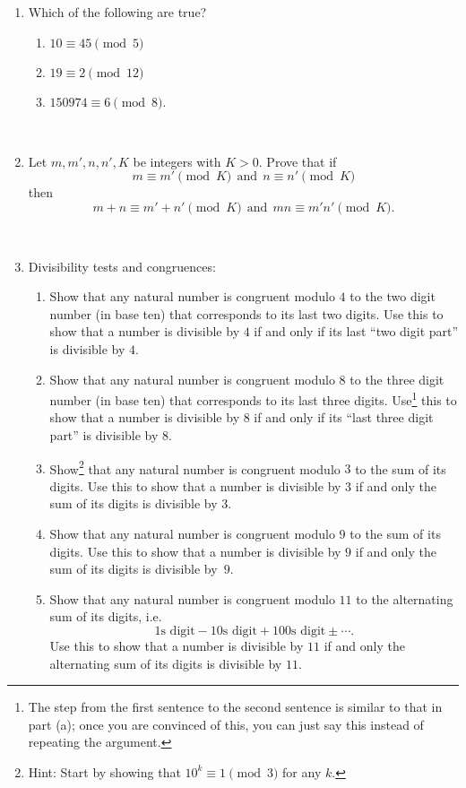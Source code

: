 \documentclass{amsart}
\begin{document}
\begin{enumerate}

\item Which of the following are true?
\begin{enumerate}
\item $10 \equiv 45 \pmod 5$
\item $19 \equiv 2 \pmod{12}$
\item $150974 \equiv 6 \pmod 8$.
\end{enumerate}


\


\item Let $m,m',n,n',K$ be integers with $K>0$. Prove that if
\[ m \equiv m' \pmod K \ \ \text{and}\  \ n \equiv n' \pmod K\]
then
\[ m+n \equiv m'+n' \pmod K \ \ \text{and} \ \ mn \equiv m'n'\pmod K.\]

\





\item Divisibility tests and congruences:
\begin{enumerate}
\item Show that any natural number is congruent modulo $4$ to the two digit number (in base ten) that corresponds to its last two digits. Use this to show that a number is divisible by $4$ if and only if its last ``two digit part'' is divisible by $4$.
\item Show that any natural number is congruent modulo $8$ to the three digit number (in base ten) that corresponds to its last three digits. Use\footnote{The step from the first sentence to the second sentence is similar to that in part (a); once you are convinced of this, you can just say this instead of repeating the argument.} this to show that a number is divisible by $8$ if and only if its ``last three digit part'' is divisible by $8$.
\item Show\footnote{Hint: Start by showing that $10^k \equiv 1 \pmod 3$ for any $k$.} that any natural number is congruent modulo $3$ to the sum of its digits. Use this to show that a number is divisible by $3$ if and only the sum of its digits is divisible by $3$.
\item Show that any natural number is congruent modulo $9$ to the sum of its digits. Use this to show that a number is divisible by $9$ if and only the sum of its digits is divisible by~$9$.
\item Show that any natural number is congruent modulo $11$ to the alternating sum of its digits, i.e.
\[ \text{1s digit} - \text{10s digit} + \text{100s digit} \pm \cdots.\]
Use this to show that a number is divisible by $11$ if and only the alternating sum of its digits is divisible by $11$.
\end{enumerate}


\end{enumerate}
\end{document}
